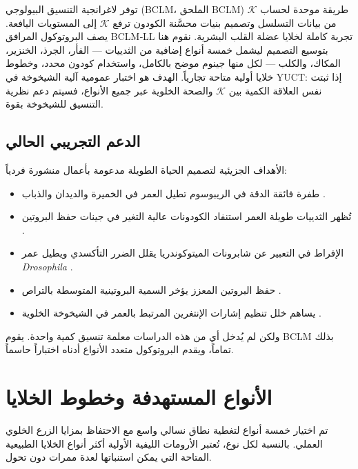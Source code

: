 \documentclass[11pt,a4paper]{article}
\newcommand{\REL}{\mathcal{K}}          %
\begin{document}
	توفر لاغرانجية التنسيق البيولوجي (BCLM، الملحق BCLM) طريقة موحدة لحساب \(\REL\) من بيانات التسلسل وتصميم بنيات محسَّنة الكودون ترفع \(\REL\) إلى المستويات اليافعة. يصف البروتوكول المرافق BCLM‑LL تجربة كاملة لخلايا عضلة القلب البشرية. نقوم هنا بتوسيع التصميم ليشمل خمسة أنواع إضافية من الثدييات — الفأر، الجرذ، الخنزير، المكاك، والكلب — لكل منها جينوم موضح بالكامل، واستخدام كودون محدد، وخطوط خلايا أولية متاحة تجارياً. الهدف هو اختبار عمومية آلية الشيخوخة في YUCT: إذا ثبتت نفس العلاقة الكمية بين \(\REL\) والصحة الخلوية عبر جميع الأنواع، فسيتم دعم نظرية التنسيق للشيخوخة بقوة.
	
	\subsection{الدعم التجريبي الحالي}
	الأهداف الجزيئية لتصميم الحياة الطويلة مدعومة بأعمال منشورة فردياً:
	\begin{itemize}
		\item طفرة فائقة الدقة في الريبوسوم تطيل العمر في الخميرة والديدان والذباب \cite{Bjedov2021}.
		\item تُظهر الثدييات طويلة العمر استنفاد الكودونات عالية التغير في جينات حفظ البروتين \cite{Kerekes2025}.
		\item الإفراط في التعبير عن شابرونات الميتوكوندريا يقلل الضرر التأكسدي ويطيل عمر \textit{Drosophila} \cite{Morrow2004}.
		\item حفظ البروتين المعزز يؤخر السمية البروتينية المتوسطة بالتراص \cite{Walker2003}.
		\item يساهم خلل تنظيم إشارات الإنتغرين المرتبط بالعمر في الشيخوخة الخلوية \cite{Takeda2019}.
	\end{itemize}
	ولكن لم يُدخل أي من هذه الدراسات معلمة تنسيق كمية واحدة. يقوم BCLM بذلك تماماً، ويقدم البروتوكول متعدد الأنواع أدناه اختباراً حاسماً.
	
	\section{الأنواع المستهدفة وخطوط الخلايا}
	\label{sec:species}
	تم اختيار خمسة أنواع لتغطية نطاق نسالي واسع مع الاحتفاظ بمزايا الزرع الخلوي العملي. بالنسبة لكل نوع، تُعتبر الأرومات الليفية الأولية أكثر أنواع الخلايا الطبيعية المتاحة التي يمكن استنباتها لعدة ممرات دون تحول.
	
\end{document}
